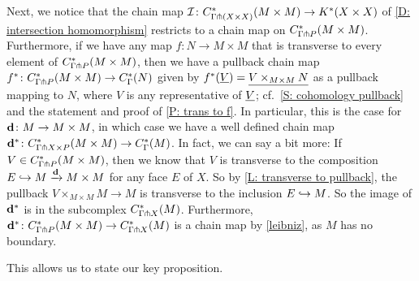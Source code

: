 \documentclass{amsart}
\begin{document}
Next, we notice that the chain map $\mathcal{I} \colon C^*_{\Gamma \pitchfork (X\times X)}(M\times M) \to K^*(X \times X)$ of \cref{D: intersection homomorphism} restricts to a chain map on $C^*_{\Gamma \pitchfork P}(M\times M)$.
Furthermore, if we have any map $f \colon N \to M \times M$ that is transverse to every element of $C^*_{\Gamma \pitchfork P}(M\times M)$, then we have a pullback chain map $f^* \colon C^*_{\Gamma \pitchfork P}(M\times M) \to C^*_\Gamma(N)$ given by $f^*(\underline{V}) = \underline{V \times_{M \times M} N}$ as a pullback mapping to $N$, where $V$ is any representative of $\underline{V}$; cf.\ \cref{S: cohomology pullback} and the statement and proof of \cref{P: trans to f}.
In particular, this is the case for $\mathbf{d} \colon M \to M \times M$, in which case we have a well defined chain map $\mathbf{d}^* \colon C^*_{\Gamma \pitchfork X\times P}(M\times M) \to C^*_\Gamma(M)$.
In fact, we can say a bit more: If $V \in  C^*_{\Gamma \pitchfork P}(M\times M)$, then we know that $V$ is transverse to the composition $E \hookrightarrow M \xrightarrow{\mathbf{d}} M \times M$ for any face $E$ of $X$.
So by \cref{L: transverse to pullback}, the pullback $V \times_{M \times M} M \to M$ is transverse to the inclusion $E \hookrightarrow M$.
So the image of $\mathbf{d}^*$ is in the subcomplex $C^*_{\Gamma \pitchfork X}(M)$.
Furthermore, $\mathbf{d}^* \colon C^*_{\Gamma \pitchfork P}(M \times M) \to C^*_{\Gamma \pitchfork X}(M)$ is a chain map by \cref{leibniz}, as $M$ has no boundary.

This allows us to state our key proposition.
\end{document}
